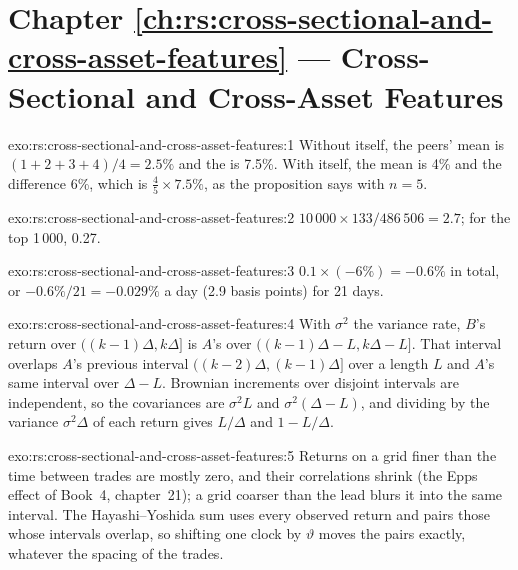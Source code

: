\section*{Chapter \ref{ch:rs:cross-sectional-and-cross-asset-features} --- Cross-Sectional and Cross-Asset Features}

\begin{solution}{exo:rs:cross-sectional-and-cross-asset-features:1}
Without itself, the peers' mean is $(1 + 2 + 3 + 4)/4 = 2.5\%$ and the  is 7.5\%. With itself, the mean is 4\% and
the difference 6\%, which is $\frac45 \times 7.5\%$, as the proposition says with $n = 5$.
\end{solution}

\begin{solution}{exo:rs:cross-sectional-and-cross-asset-features:2}
$10\,000 \times 133/486\,506 = 2.7$; for the top 1\,000, 0.27.
\end{solution}

\begin{solution}{exo:rs:cross-sectional-and-cross-asset-features:3}
$0.1 \times (-6\%) = -0.6\%$ in total, or $-0.6\%/21 = -0.029\%$ a day (2.9 basis points) for 21 days.
\end{solution}

\begin{solution}{exo:rs:cross-sectional-and-cross-asset-features:4}
With $\sigma^2$ the variance rate, $B$'s return over $((k-1)\Delta, k\Delta]$ is $A$'s over $((k-1)\Delta - L, k\Delta - L]$. That interval
overlaps $A$'s previous interval $((k-2)\Delta, (k-1)\Delta]$ over a length $L$ and $A$'s same interval over $\Delta - L$. Brownian increments
over disjoint intervals are independent, so the covariances are $\sigma^2 L$ and $\sigma^2(\Delta - L)$, and dividing by the variance
$\sigma^2\Delta$ of each return gives $L/\Delta$ and $1 - L/\Delta$.
\end{solution}

\begin{solution}{exo:rs:cross-sectional-and-cross-asset-features:5}
Returns on a grid finer than the time between trades are mostly zero, and their correlations shrink (the Epps effect of Book~4,
chapter~21); a grid coarser than the lead blurs it into the same interval. The Hayashi--Yoshida sum uses every observed return and
pairs those whose intervals overlap, so shifting one clock by $\vartheta$ moves the pairs exactly, whatever the spacing of the trades.
\end{solution}

